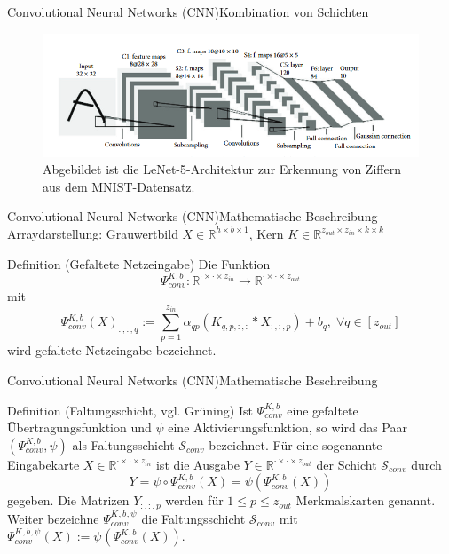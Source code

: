 \documentclass[10pt]{beamer} %
\newcommand{\RR}{\ensuremath{\mathbb{R}}}
\begin{document}
\begin{frame}{Convolutional Neural Networks (CNN)}{Kombination von Schichten}
   \begin{figure}
      \includegraphics[width=1\textwidth]{pics/lecun5.png}
      \caption{Abgebildet ist die LeNet-5-Architektur\cite{lecun} zur Erkennung von Ziffern aus dem MNIST-Datensatz.} 
   \end{figure}
\end{frame}

\begin{frame}{Convolutional Neural Networks (CNN)}{Mathematische Beschreibung}
Arraydarstellung:  Grauwertbild $X \in \RR^{h \times b \times 1}$,
    Kern $K \in \RR^{z_{out} \times z_{in} \times k \times k}$
\pause
\begin{block}{Definition (Gefaltete Netzeingabe)}
   Die Funktion 
    \begin{equation*}
        \Psi_{conv}^{K,b}: \RR^{\cdot \times \cdot \times z_{in}} \rightarrow \RR^{\cdot \times \cdot\times z_{out}}
    \end{equation*}
    mit
    \begin{equation*}
        \Psi_{conv}^{K,b}(X)_{:,:,q}:= \sum_{p=1}^{z_{in}} \alpha_{qp} \left(K_{q,p,:,:} \ast X_{:,:,p} \right) +b_q, \; \forall q \in [z_{out}]
    \end{equation*}
    wird gefaltete Netzeingabe bezeichnet.
\end{block}
\end{frame}

\begin{frame}{Convolutional Neural Networks (CNN)}{Mathematische Beschreibung}
   \begin{block}{Definition (Faltungsschicht, vgl. Grüning\cite{gruening})}
      Ist $\Psi_{conv}^{K,b}$ eine gefaltete Übertragungsfunktion und $\psi$ eine Aktivierungsfunktion, so wird das Paar $(\Psi_{conv}^{K,b}, \psi)$ als Faltungsschicht $\mathcal{S}_{conv}$ bezeichnet. Für eine sogenannte Eingabekarte $X \in \RR^{\cdot \times \cdot \times z_{in}}$ ist die Ausgabe $Y \in \RR^{\cdot \times \cdot \times z_{out}}$ der Schicht $\mathcal{S}_{conv}$ durch
    \[Y=\psi \circ \Psi_{conv}^{K,b}(X)= \psi\left(\Psi_{conv}^{K,b}(X)\right)
        \] 
        gegeben. Die Matrizen $Y_{:,:,p}$ werden für $1 \leq p \leq z_{out}$ Merkmalskarten genannt. Weiter bezeichne $\Psi_{conv}^{K^{},b^{},\psi_{}}$ die Faltungsschicht $\mathcal{S}_{conv}$ mit $\Psi_{conv}^{K^{},b^{},\psi_{}}(X):= \psi_{} \left(\Psi_{conv}^{K^{},b^{}}(X)\right)$.
   \end{block}
\end{frame}
\end{document}
